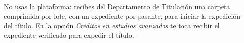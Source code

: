 \documentclass[11pt,a4paper]{article}
\begin{document}
{\small\tableofcontents}
\newpage
\begin{quevasahacer}
No usas la plataforma: recibes del Departamento de Titulación una carpeta comprimida por lote, con un expediente por pasante, para iniciar la expedición del título. En la opción \emph{Créditos en estudios avanzados} te toca recibir el expediente verificado para expedir el título.
\end{quevasahacer}



\end{document}
